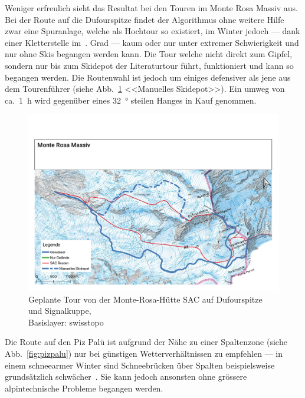 
Weniger erfreulich sieht das Resultat bei den Touren im Monte Rosa Massiv aus. Bei der Route auf die Dufourspitze findet der Algorithmus ohne weitere Hilfe zwar eine Spuranlage, welche als Hochtour so existiert, im Winter jedoch --- dank einer Kletterstelle im~. Grad --- kaum oder nur unter extremer Schwierigkeit und nur ohne Skis begangen werden kann. 
Die Tour welche nicht direkt zum Gipfel, sondern nur bis zum Skidepot der Literaturtour führt, funktioniert und kann so begangen werden. Die Routenwahl ist jedoch um einiges defensiver als jene aus dem Tourenführer (siehe Abb.\ \ref{fig:monterosa} <<Manuelles Skidepot>>). Ein umweg von ca.\ \qty{1}{h} wird gegenüber eines \qty{32}{°} steilen Hanges in Kauf genommen.

\begin{figure}[h]
  \centering
  \includegraphics[page=1,width=.9\linewidth]{./../evaluation/PDFs/Monte Rosa Massiv.pdf}
  \caption{Geplante Tour von der Monte-Rosa-Hütte SAC auf Dufourspitze und Signalkuppe,\\Basislayer: swisstopo}\label{fig:monterosa}
\end{figure}

Die Route auf den Piz Palü ist aufgrund der Nähe zu einer Spaltenzone (siehe Abb.\ \ref{fig:pizpalu}) nur bei günstigen Wetterverhältnissen zu empfehlen --- in einem schneearmer Winter sind Schneebrücken über Spalten beispielsweise grundsätzlich schwächer~\cite{bergsteigenErhhtesRisiko}. Sie kann jedoch ansonsten ohne grössere alpintechnische Probleme begangen werden.

